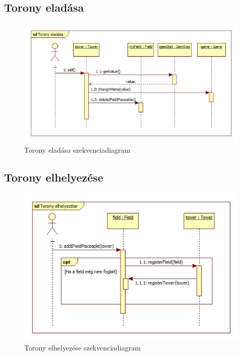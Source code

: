 \subsection{Torony eladása}
\begin{figure}[H]
\begin{center}
\includegraphics[width=17cm]{chapters/chapter03/images/Torony_eladasa.jpg}
\caption{Torony eladása szekvenciadiagram}
\label{fig:Torony_eladása}
\end{center}
\end{figure}

\subsection{Torony elhelyezése}
\begin{figure}[H]
\begin{center}
\includegraphics[width=17cm]{chapters/chapter03/images/Torony_elhelyezese.jpg}
\caption{Torony elhelyezése szekvenciadiagram}
\label{fig:Torony_elhelyezése}
\end{center}
\end{figure}

